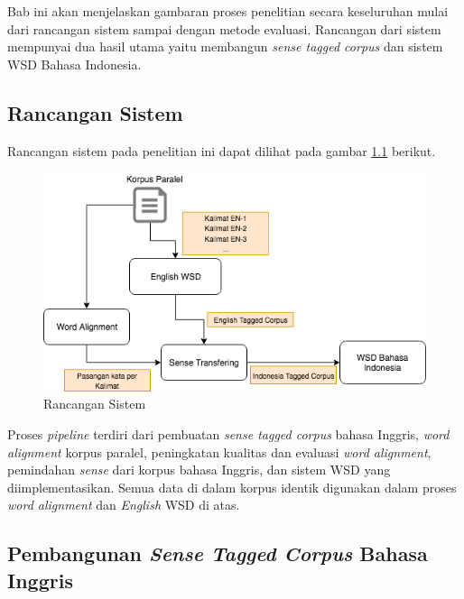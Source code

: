 \chapter{\babTiga}
Bab ini akan menjelaskan gambaran proses penelitian secara keseluruhan mulai dari rancangan sistem sampai dengan metode evaluasi. Rancangan dari sistem mempunyai dua hasil utama yaitu membangun \textit{sense tagged corpus} dan sistem WSD Bahasa Indonesia.

\section{Rancangan Sistem}

Rancangan sistem pada penelitian ini dapat dilihat pada gambar \ref{fig:Rancangan-Sistem} berikut.

\begin{figure}
	\centering
	\includegraphics[width=1\linewidth]{adit_pics/WSD-full}
	\caption{Rancangan Sistem}
	\label{fig:Rancangan-Sistem}
\end{figure}

Proses \textit{pipeline} terdiri dari pembuatan \textit{sense tagged corpus} bahasa Inggris,  \textit{word alignment} korpus paralel, peningkatan kualitas dan evaluasi \textit{word alignment}, pemindahan \textit{sense} dari korpus bahasa Inggris, dan sistem WSD yang diimplementasikan. Semua data di dalam korpus identik digunakan dalam proses \textit{word alignment} dan \textit{English} WSD di atas.

\section{Pembangunan \textit{Sense Tagged Corpus} Bahasa Inggris}

